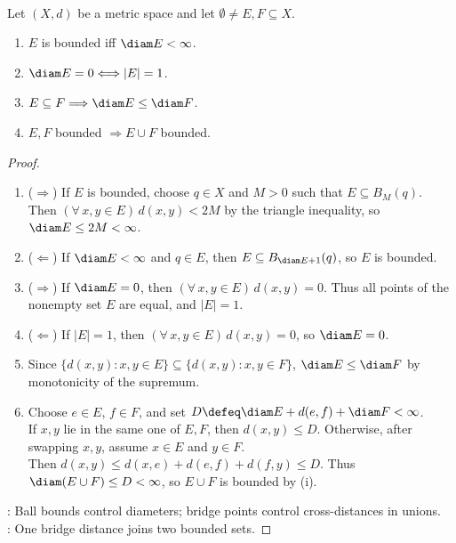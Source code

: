 \begin{proposition} \label{prop:diameter-basic-properties} \\
Let $(X,d)$ be a metric space and let $\emptyset\ne E,F\subseteq X$.
\begin{enumerate}[label=(\roman*)]
\setlength{\itemsep}{0pt}
\item $E$ is bounded iff $\diam E<\infty$.
\item $\diam E=0\Longleftrightarrow |E|=1$.
\item $E\subseteq F\Longrightarrow\diam E\leq\diam F$.
\item $E,F$ bounded $\Longrightarrow E\cup F$ bounded.
\end{enumerate}
\begin{proof}
\begin{enumerate}[label=(\roman*)]
\setlength{\itemsep}{0pt}
\item[$(i)$] ($\Rightarrow$) If $E$ is bounded, choose $q\in X$ and $M>0$ such that $E\subseteq B_M(q)$.\\
Then $(\forall\,x,y\in E)\,d(x,y)<2M$ by the triangle inequality, so $\diam E\leq2M<\infty$.\\
\item[$(i)$] ($\Leftarrow$) If $\diam E<\infty$ and $q\in E$, then $E\subseteq B_{\diam E+1}(q)$, so $E$ is bounded.
\item[$(ii)$] ($\Rightarrow$) If $\diam E=0$, then $(\forall\,x,y\in E)\,d(x,y)=0$. Thus all points of the nonempty set $E$ are equal, and $|E|=1$.\\
\item[$(ii)$] ($\Leftarrow$) If $|E|=1$, then $(\forall\,x,y\in E)\,d(x,y)=0$, so $\diam E=0$.
\item[$(iii)$] Since $\{d(x,y):x,y\in E\}\subseteq\{d(x,y):x,y\in F\}$, $\diam E\leq\diam F$ by monotonicity of the supremum.
\item[$(iv)$] Choose $e\in E$, $f\in F$, and set $D\defeq\diam E+d(e,f)+\diam F<\infty$.\\
If $x,y$ lie in the same one of $E,F$, then $d(x,y)\leq D$. Otherwise, after swapping $x,y$, assume $x\in E$ and $y\in F$.\\
Then $d(x,y)\leq d(x,e)+d(e,f)+d(f,y)\leq D$. Thus $\diam(E\cup F)\leq D<\infty$, so $E\cup F$ is bounded by (i).
\end{enumerate}
: Ball bounds control diameters; bridge points control cross-distances in unions.\\
: One bridge distance joins two bounded sets.
\end{proof}
\end{proposition}

